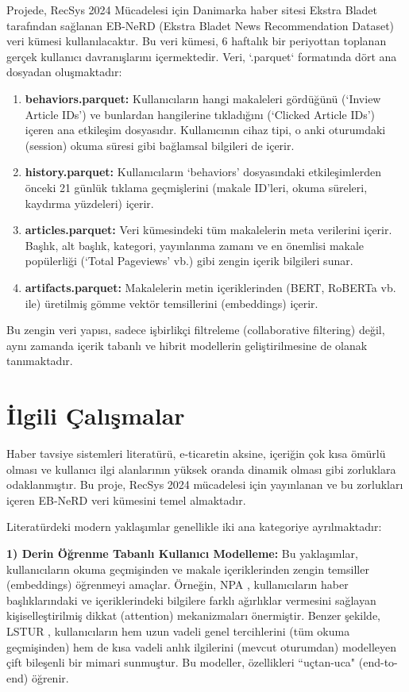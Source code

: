 \documentclass[conference]{IEEEtran}
\begin{document}
Projede, RecSys 2024 Mücadelesi için Danimarka haber sitesi Ekstra Bladet tarafından sağlanan EB-NeRD (Ekstra Bladet News Recommendation Dataset) veri kümesi kullanılacaktır. Bu veri kümesi, 6 haftalık bir periyottan toplanan gerçek kullanıcı davranışlarını içermektedir. Veri, `.parquet` formatında dört ana dosyadan oluşmaktadır:

\begin{enumerate}
    \item \textbf{behaviors.parquet:} Kullanıcıların hangi makaleleri gördüğünü (`Inview Article IDs') ve bunlardan hangilerine tıkladığını (`Clicked Article IDs') içeren ana etkileşim dosyasıdır. Kullanıcının cihaz tipi, o anki oturumdaki (session) okuma süresi gibi bağlamsal bilgileri de içerir.
    \item \textbf{history.parquet:} Kullanıcıların `behaviors' dosyasındaki etkileşimlerden önceki 21 günlük tıklama geçmişlerini (makale ID'leri, okuma süreleri, kaydırma yüzdeleri) içerir.
    \item \textbf{articles.parquet:} Veri kümesindeki tüm makalelerin meta verilerini içerir. Başlık, alt başlık, kategori, yayınlanma zamanı ve en önemlisi makale popülerliği (`Total Pageviews' vb.) gibi zengin içerik bilgileri sunar.
    \item \textbf{artifacts.parquet:} Makalelerin metin içeriklerinden (BERT, RoBERTa vb. ile) üretilmiş gömme vektör temsillerini (embeddings) içerir.
\end{enumerate}

Bu zengin veri yapısı, sadece işbirlikçi filtreleme (collaborative filtering) değil, aynı zamanda içerik tabanlı ve hibrit modellerin geliştirilmesine de olanak tanımaktadır.

\section{İlgili Çalışmalar}
\label{sec:relatedwork}

Haber tavsiye sistemleri literatürü, e-ticaretin aksine, içeriğin çok kısa ömürlü olması ve kullanıcı ilgi alanlarının yüksek oranda dinamik olması gibi zorluklara odaklanmıştır. Bu proje, RecSys 2024 mücadelesi için yayınlanan ve bu zorlukları içeren EB-NeRD veri kümesini \cite{kruse2024recsys} temel almaktadır.

Literatürdeki modern yaklaşımlar genellikle iki ana kategoriye ayrılmaktadır:

\textbf{1) Derin Öğrenme Tabanlı Kullanıcı Modelleme:} Bu yaklaşımlar, kullanıcıların okuma geçmişinden ve makale içeriklerinden zengin temsiller (embeddings) öğrenmeyi amaçlar. Örneğin, NPA \cite{wu2019npa}, kullanıcıların haber başlıklarındaki ve içeriklerindeki bilgilere farklı ağırlıklar vermesini sağlayan kişiselleştirilmiş dikkat (attention) mekanizmaları önermiştir. Benzer şekilde, LSTUR \cite{an2019lstur}, kullanıcıların hem uzun vadeli genel tercihlerini (tüm okuma geçmişinden) hem de kısa vadeli anlık ilgilerini (mevcut oturumdan) modelleyen çift bileşenli bir mimari sunmuştur. Bu modeller, özellikleri ``uçtan-uca" (end-to-end) öğrenir.
\end{document}
